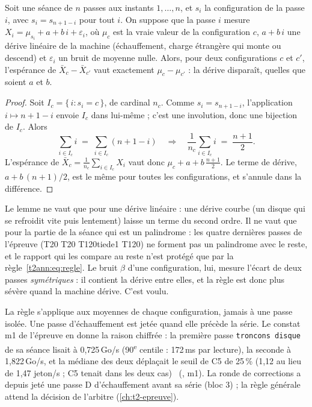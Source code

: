 \begin{lemme}\label{t2ann:lem:palindrome}
Soit une séance de $n$ passes aux instants $1, \dots, n$, et $s_i$ la configuration de la passe $i$, avec $s_i = s_{n+1-i}$ pour tout $i$. On suppose que la passe $i$ mesure $X_i = \mu_{s_i} + a + b\,i + \varepsilon_i$, où $\mu_c$ est la vraie valeur de la configuration $c$, $a + b\,i$ une dérive linéaire de la machine (échauffement, charge étrangère qui monte ou descend) et $\varepsilon_i$ un bruit de moyenne nulle. Alors, pour deux configurations $c$ et $c'$, l'espérance de $\bar X_c - \bar X_{c'}$ vaut exactement $\mu_c - \mu_{c'}$ : la dérive disparaît, quelles que soient $a$ et $b$.
\end{lemme}
\begin{proof}
Soit $I_c = \{\, i : s_i = c \,\}$, de cardinal $n_c$. Comme $s_i = s_{n+1-i}$, l'application $i \mapsto n+1-i$ envoie $I_c$ dans lui-même ; c'est une involution, donc une bijection de $I_c$. Alors
\[
\sum_{i \in I_c} i \;=\; \sum_{i \in I_c} (n+1-i) \quad\Longrightarrow\quad \frac{1}{n_c}\sum_{i \in I_c} i \;=\; \frac{n+1}{2}.
\]
L'espérance de $\bar X_c = \frac{1}{n_c}\sum_{i\in I_c} X_i$ vaut donc $\mu_c + a + b\,\frac{n+1}{2}$. Le terme de dérive, $a + b\,(n+1)/2$, est le même pour toutes les configurations, et s'annule dans la différence.
\end{proof}

\begin{remarque}
Le lemme ne vaut que pour une dérive linéaire : une dérive courbe (un disque qui se refroidit vite puis lentement) laisse un terme du second ordre. Il ne vaut que pour la partie de la séance qui est un palindrome : les quatre dernières passes de l'épreuve (T20 T20 T120tiede1 T120) ne forment pas un palindrome avec le reste, et le rapport qui les compare au reste n'est protégé que par la règle~\eqref{t2ann:eq:regle}. Le bruit $\beta$ d'une configuration, lui, mesure l'écart de deux passes \emph{symétriques} : il contient la dérive entre elles, et la règle est donc plus sévère quand la machine dérive. C'est voulu.
\end{remarque}

La règle s'applique aux moyennes de chaque configuration, jamais à une passe isolée. Une passe d'échauffement est jetée quand elle précède la série. Le constat m1 de l'épreuve en donne la raison chiffrée : la première passe \texttt{troncons disque} de sa séance lisait à 0,725\,Go/s (90\textsuperscript{e} centile : 172\,ms par lecture), la seconde à 1,822\,Go/s, et la médiane des deux déplaçait le seuil de C5 de 25\,\% (1,12 au lieu de 1,47 jeton/s ; C5 tenait dans les deux cas) \mes~(, m1). La ronde de corrections a depuis jeté une passe D d'échauffement avant sa série (bloc 3) ; la règle générale attend la décision de l'arbitre (\cref{ch:t2-epreuve}).

